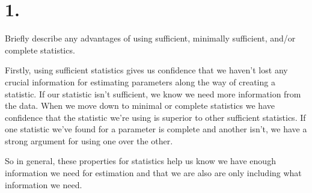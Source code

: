 \section*{1.}

Briefly describe any advantages of using sufficient, minimally sufficient, and/or complete statistics.

Firstly, using sufficient statistics gives us confidence that we haven't lost any crucial information for estimating parameters along the way of creating a statistic. If our statistic isn't sufficient, we know we need more information from the data. When we move down to minimal or complete statistics we have confidence that the statistic we're using is superior to other sufficient statistics. If one statistic we've found for a parameter is complete and another isn't, we have a strong argument for using one over the other. 

So in general, these properties for statistics help us know we have enough information we need for estimation and that we are also are only including what information we need.  

